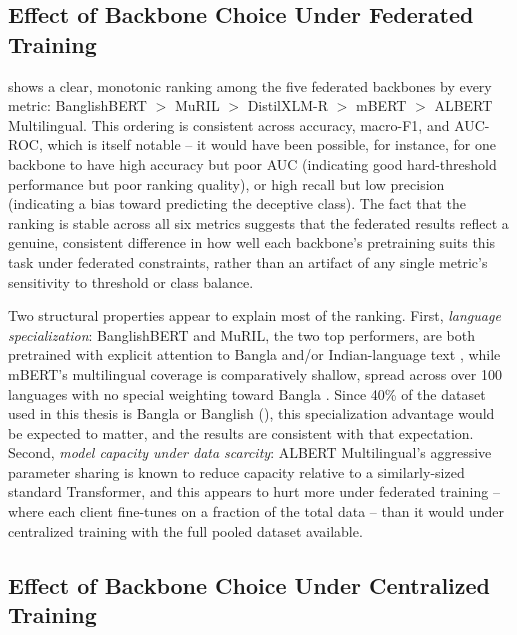 \subsection{Effect of Backbone Choice Under Federated Training}
\label{sec:backbone-federated}

 shows a clear, monotonic ranking among the five federated backbones by every metric: BanglishBERT $>$ MuRIL $>$ DistilXLM-R $>$ mBERT $>$ ALBERT Multilingual. This ordering is consistent across accuracy, macro-F1, and AUC-ROC, which is itself notable -- it would have been possible, for instance, for one backbone to have high accuracy but poor AUC (indicating good hard-threshold performance but poor ranking quality), or high recall but low precision (indicating a bias toward predicting the deceptive class). The fact that the ranking is stable across all six metrics suggests that the federated results reflect a genuine, consistent difference in how well each backbone's pretraining suits this task under federated constraints, rather than an artifact of any single metric's sensitivity to threshold or class balance.

Two structural properties appear to explain most of the ranking. First, \emph{language specialization}: BanglishBERT and MuRIL, the two top performers, are both pretrained with explicit attention to Bangla and/or Indian-language text \cite{bhattacharjee2022banglabert, khanuja2021muril}, while mBERT's multilingual coverage is comparatively shallow, spread across over 100 languages with no special weighting toward Bangla \cite{devlin2019bert}. Since 40\% of the dataset used in this thesis is Bangla or Banglish (), this specialization advantage would be expected to matter, and the results are consistent with that expectation. Second, \emph{model capacity under data scarcity}: ALBERT Multilingual's aggressive parameter sharing \cite{lan2020albert} is known to reduce capacity relative to a similarly-sized standard Transformer, and this appears to hurt more under federated training -- where each client fine-tunes on a fraction of the total data -- than it would under centralized training with the full pooled dataset available.

\subsection{Effect of Backbone Choice Under Centralized Training}
\label{sec:backbone-centralized}

